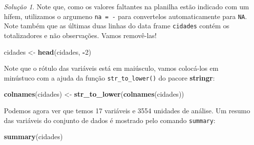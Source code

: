\documentclass[
]{latex/krantz}
\newenvironment{Shaded}{\begin{snugshade}}{\end{snugshade}}
\newcommand{\DecValTok}[1]{\textcolor[rgb]{0.00,0.00,0.81}{#1}}
\newcommand{\FunctionTok}[1]{\textcolor[rgb]{0.13,0.29,0.53}{\textbf{#1}}}
\newcommand{\NormalTok}[1]{#1}
\newcommand{\OtherTok}[1]{\textcolor[rgb]{0.56,0.35,0.01}{#1}}
\newcommand{\SpecialCharTok}[1]{\textcolor[rgb]{0.81,0.36,0.00}{\textbf{#1}}}
\theoremstyle{definition}
\theoremstyle{definition}
\theoremstyle{definition}
\theoremstyle{definition}
\theoremstyle{remark}
\newtheorem*{solution}{Solução}
\begin{document}
\begin{solution}
Note que, como os valores faltantes na planilha estão indicado com um hífem, utilizamos o argumeno \texttt{na\ =\ \textquotesingle{}-\textquotesingle{}} para convertelos automaticamente para \texttt{NA}. Note também que as últimas duas linhas do data frame \texttt{cidades} contém os totalizadores e não observações. Vamos removê-las!

\begin{Shaded}
\begin{Highlighting}[]
\NormalTok{cidades }\OtherTok{\textless{}{-}} \FunctionTok{head}\NormalTok{(cidades, }\SpecialCharTok{{-}}\DecValTok{2}\NormalTok{)}
\end{Highlighting}
\end{Shaded}

Note que o rótulo das variáveis está em maiúsculo, vamos colocá-los em minústuco com a ajuda da função \texttt{str\_to\_lower()} do pacore \textbf{stringr}:

\begin{Shaded}
\begin{Highlighting}[]
\FunctionTok{colnames}\NormalTok{(cidades) }\OtherTok{\textless{}{-}} \FunctionTok{str\_to\_lower}\NormalTok{(}\FunctionTok{colnames}\NormalTok{(cidades))}
\end{Highlighting}
\end{Shaded}

Podemos agora ver que temos 17 variáveis e 3554 unidades de análise. Um resumo das variáveis do conjunto de dados é mostrado pelo comando \texttt{summary}:

\begin{Shaded}
\begin{Highlighting}[]
\FunctionTok{summary}\NormalTok{(cidades)}
\end{Highlighting}
\end{Shaded}


\end{solution}
\end{document}
